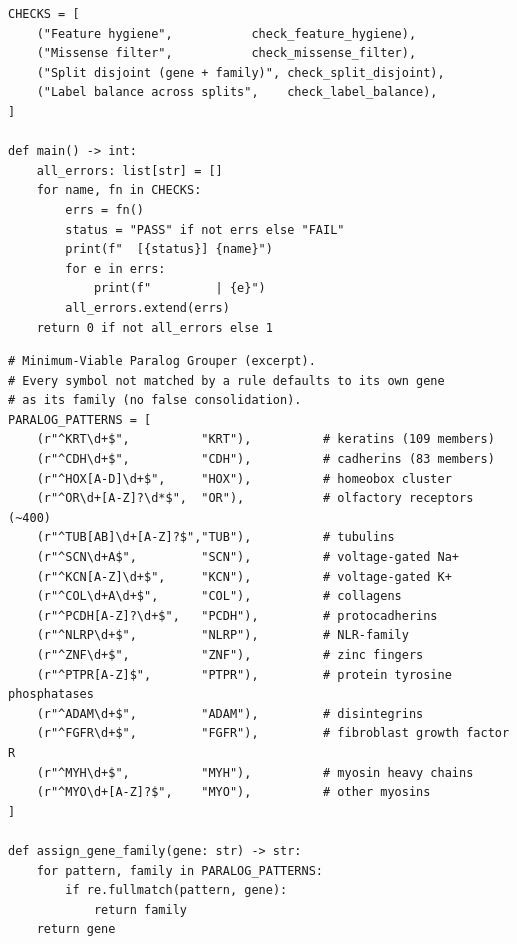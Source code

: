\documentclass[11pt,a4paper,oneside]{report}
\begin{document}
\begin{lstlisting}[caption={The four leakage checks in \texttt{src/verify\_no\_leakage.py}.}]
CHECKS = [
    ("Feature hygiene",           check_feature_hygiene),
    ("Missense filter",           check_missense_filter),
    ("Split disjoint (gene + family)", check_split_disjoint),
    ("Label balance across splits",    check_label_balance),
]

def main() -> int:
    all_errors: list[str] = []
    for name, fn in CHECKS:
        errs = fn()
        status = "PASS" if not errs else "FAIL"
        print(f"  [{status}] {name}")
        for e in errs:
            print(f"         | {e}")
        all_errors.extend(errs)
    return 0 if not all_errors else 1
\end{lstlisting}

\begin{lstlisting}[caption={Paralog-family grouper --- 16
clinically-relevant paralog clusters covered by regex rules in
\texttt{src/data\_splitting.py}; see deficiency-D8 discussion in
Section~\ref{sec:res-denovo}.}]
# Minimum-Viable Paralog Grouper (excerpt).
# Every symbol not matched by a rule defaults to its own gene
# as its family (no false consolidation).
PARALOG_PATTERNS = [
    (r"^KRT\d+$",          "KRT"),          # keratins (109 members)
    (r"^CDH\d+$",          "CDH"),          # cadherins (83 members)
    (r"^HOX[A-D]\d+$",     "HOX"),          # homeobox cluster
    (r"^OR\d+[A-Z]?\d*$",  "OR"),           # olfactory receptors (~400)
    (r"^TUB[AB]\d+[A-Z]?$","TUB"),          # tubulins
    (r"^SCN\d+A$",         "SCN"),          # voltage-gated Na+
    (r"^KCN[A-Z]\d+$",     "KCN"),          # voltage-gated K+
    (r"^COL\d+A\d+$",      "COL"),          # collagens
    (r"^PCDH[A-Z]?\d+$",   "PCDH"),         # protocadherins
    (r"^NLRP\d+$",         "NLRP"),         # NLR-family
    (r"^ZNF\d+$",          "ZNF"),          # zinc fingers
    (r"^PTPR[A-Z]$",       "PTPR"),         # protein tyrosine phosphatases
    (r"^ADAM\d+$",         "ADAM"),         # disintegrins
    (r"^FGFR\d+$",         "FGFR"),         # fibroblast growth factor R
    (r"^MYH\d+$",          "MYH"),          # myosin heavy chains
    (r"^MYO\d+[A-Z]?$",    "MYO"),          # other myosins
]

def assign_gene_family(gene: str) -> str:
    for pattern, family in PARALOG_PATTERNS:
        if re.fullmatch(pattern, gene):
            return family
    return gene
\end{lstlisting}
\end{document}
